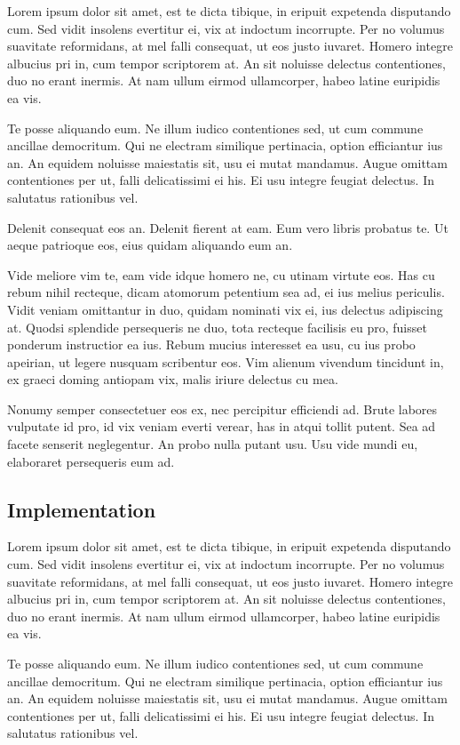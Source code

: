 \documentclass[10pt, letterpapper]{proc}
\begin{document}
Lorem ipsum dolor sit amet, est te dicta tibique, in eripuit expetenda disputando cum. Sed vidit insolens evertitur ei, vix at indoctum incorrupte. Per no volumus suavitate reformidans, at mel falli consequat, ut eos justo iuvaret. Homero integre albucius pri in, cum tempor scriptorem at. An sit noluisse delectus contentiones, duo no erant inermis. At nam ullum eirmod ullamcorper, habeo latine euripidis ea vis.

Te posse aliquando eum. Ne illum iudico contentiones sed, ut cum commune ancillae democritum. Qui ne electram similique pertinacia, option efficiantur ius an. An equidem noluisse maiestatis sit, usu ei mutat mandamus. Augue omittam contentiones per ut, falli delicatissimi ei his. Ei usu integre feugiat delectus. In salutatus rationibus vel.

Delenit consequat eos an. Delenit fierent at eam. Eum vero libris probatus te. Ut aeque patrioque eos, eius quidam aliquando eum an.

Vide meliore vim te, eam vide idque homero ne, cu utinam virtute eos. Has cu rebum nihil recteque, dicam atomorum petentium sea ad, ei ius melius periculis. Vidit veniam omittantur in duo, quidam nominati vix ei, ius delectus adipiscing at. Quodsi splendide persequeris ne duo, tota recteque facilisis eu pro, fuisset ponderum instructior ea ius. Rebum mucius interesset ea usu, cu ius probo apeirian, ut legere nusquam scribentur eos. Vim alienum vivendum tincidunt in, ex graeci doming antiopam vix, malis iriure delectus cu mea.

Nonumy semper consectetuer eos ex, nec percipitur efficiendi ad. Brute labores vulputate id pro, id vix veniam everti verear, has in atqui tollit putent. Sea ad facete senserit neglegentur. An probo nulla putant usu. Usu vide mundi eu, elaboraret persequeris eum ad.

\subsection{Implementation} \label{label:mpure_algo}
Lorem ipsum dolor sit amet, est te dicta tibique, in eripuit expetenda disputando cum. Sed vidit insolens evertitur ei, vix at indoctum incorrupte. Per no volumus suavitate reformidans, at mel falli consequat, ut eos justo iuvaret. Homero integre albucius pri in, cum tempor scriptorem at. An sit noluisse delectus contentiones, duo no erant inermis. At nam ullum eirmod ullamcorper, habeo latine euripidis ea vis.

Te posse aliquando eum. Ne illum iudico contentiones sed, ut cum commune ancillae democritum. Qui ne electram similique pertinacia, option efficiantur ius an. An equidem noluisse maiestatis sit, usu ei mutat mandamus. Augue omittam contentiones per ut, falli delicatissimi ei his. Ei usu integre feugiat delectus. In salutatus rationibus vel.
\end{document}
